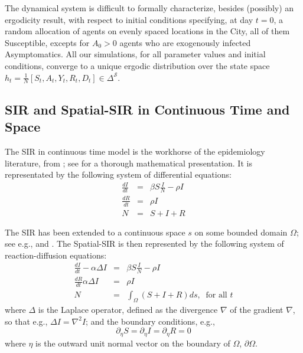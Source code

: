 \documentclass[english,11pt]{article}
\begin{document}
 The dynamical system is difficult to formally characterize, besides (possibly) an ergodicity result, with respect to initial conditions specifying, at  day $t=0$, a random allocation of  agents on evenly spaced locations in the City, all of them Susceptible, excepts for $A_0>0$ agents  who are exogenously infected Asymptomatics.  
 All our simulations, for all parameter values and initial conditions, converge to a unique ergodic distribution over the state space $h_t=\frac{1}{N}[S_t,A_t,Y_t,R_t,D_t] \in \Delta^{\mathcal{S}}$.
\\

\subsection{SIR and Spatial-SIR in Continuous Time and Space}

The SIR in continuous time model is the workhorse of the epidemiology literature, from \cite{kermack1927contribution}; see \cite{herben42hethcote} for a thorough mathematical presentation. It is representated by the following system of differential equations: 
\begin{eqnarray*} 
\frac{dI}{dt} &=& \beta S \frac{I}{N} -\rho I
\\
\frac{dR}{dt} &=&  \rho I
\\
N &=& S+I+R
\end{eqnarray*}

The SIR has been extended to a continuous space $s$ on some bounded domain $\Omega$; see e.g., \cite{chinviriyasit2010numerical} and \cite{wu2017epidemic}.  The Spatial-SIR  is then  represented by the following system of reaction-diffusion equations: 
\begin{eqnarray*} 
\frac{dI}{dt} -\alpha \Delta I &=& \beta S \frac{I}{N} -\rho I
\\
\frac{dR}{dt} \alpha \Delta I  &=&  \rho I
\\
N &=& \int_{\Omega} (S+I+R)ds, \; \; \mbox{for all } t
\end{eqnarray*}
where $\Delta$ is the Laplace operator, defined as the divergence $\nabla$ of the gradient $\nabla$, so that e.g., $\Delta I=\nabla^2 I$; and the boundary conditions, e.g., 
$$ \partial_{\eta} S=\partial_{\eta} I=\partial_{\eta} R=0 $$  where $\eta$ is the outward unit normal vector on the boundary of $\Omega$, $\partial \Omega$.



\end{document}
